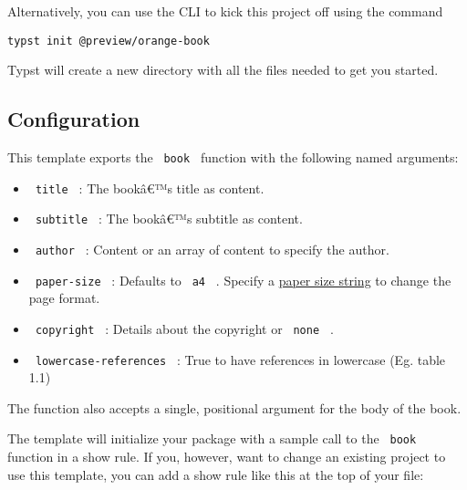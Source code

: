 Alternatively, you can use the CLI to kick this project off using the
command

\begin{verbatim}
typst init @preview/orange-book
\end{verbatim}

Typst will create a new directory with all the files needed to get you
started.

\subsection{Configuration}\label{configuration}

This template exports the \texttt{\ book\ } function with the following
named arguments:

\begin{itemize}
\tightlist
\item
  \texttt{\ title\ } : The bookâ€™s title as content.
\item
  \texttt{\ subtitle\ } : The bookâ€™s subtitle as content.
\item
  \texttt{\ author\ } : Content or an array of content to specify the
  author.
\item
  \texttt{\ paper-size\ } : Defaults to \texttt{\ a4\ } . Specify a
  \href{https://typst.app/docs/reference/layout/page/\#parameters-paper}{paper
  size string} to change the page format.
\item
  \texttt{\ copyright\ } : Details about the copyright or
  \texttt{\ none\ } .
\item
  \texttt{\ lowercase-references\ } : True to have references in
  lowercase (Eg. table 1.1)
\end{itemize}

The function also accepts a single, positional argument for the body of
the book.

The template will initialize your package with a sample call to the
\texttt{\ book\ } function in a show rule. If you, however, want to
change an existing project to use this template, you can add a show rule
like this at the top of your file:

